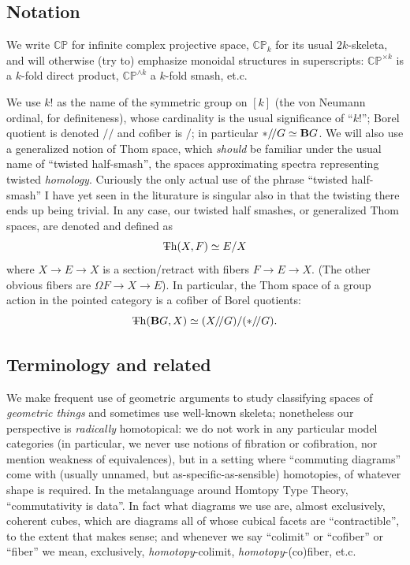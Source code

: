 \documentclass{article}
\newcommand{\CP}{\mathbb{CP}}
\newcommand{\6}{\partial}
\newcommand{\8}{\infty}
\newcommand{\bq}{/\!/}
\newcommand{\smsh}{\wedge}
\begin{document}
\subsection*{Notation} We write $\CP$ for infinite complex projective space, $\CP_k$ for its usual $2k$-skeleta, and will otherwise (try to) emphasize monoidal structures in superscripts: $\CP^{\times k}$ is a $k$-fold direct product, $\CP^{\smsh k}$ a $k$-fold smash, et.c.

We use $k!$ as the name of the symmetric group on $[k]$ (the von Neumann ordinal, for definiteness), whose cardinality is the usual significance of ``$k!$'';
Borel quotient is denoted $\bq $ and cofiber is $/$; in particular $*\bq G \simeq \deloop G$.
We will also use a generalized notion of Thom space, which {\em should} be familiar under the usual name of ``twisted half-smash'',
 the spaces approximating spectra representing twisted {\em homology}.
Curiously the only actual use of the phrase ``twisted half-smash'' I have yet seen in the liturature is singular also in that the twisting there ends up being trivial.
In any case, our twisted half smashes, or generalized Thom spaces, are denoted and defined as
$$ \Th(X,F) \simeq E/X $$ 
where $X \to E \to X$ is a section/retract with fibers $F\to E \to X$.
(The other obvious fibers are $\Omega F \to X \to E$).  
In particular, the Thom space of a group action in the pointed category is a cofiber of Borel quotients:
$$ \Th(\deloop G, X) \simeq (X\bq G) / (*\bq G)  .$$

\subsection*{Terminology and related}

We make frequent use of geometric arguments to study classifying spaces of {\em geometric things} and sometimes use well-known skeleta; nonetheless our perspective is {\em radically} homotopical:
 we do not work in any particular model categories
 (in particular, we never use notions of fibration or cofibration, nor mention weakness of equivalences),
 but in a setting where ``commuting diagrams'' come with (usually unnamed, but as-specific-as-sensible) homotopies, of whatever shape is required.  
In the metalanguage around Homtopy Type Theory, ``commutativity is data''.  
In fact what diagrams we use are, almost exclusively, coherent cubes, which are diagrams all of whose cubical facets are ``contractible'', to the extent that makes sense;
 and whenever we say ``colimit'' or ``cofiber'' or ``fiber'' we mean, exclusively, {\em homotopy}-colimit, {\em homotopy}-(co)fiber, et.c.
\end{document}
